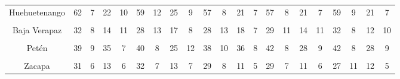 \begin{tabular}[t]{ccccccccccccccccccccc}
Huehuetenango & 62 & 7 & 22 & 10 & 59 & 12 & 25 & 9 & 57 & 8 & 21 & 7 & 57 & 8 & 21 & 7 & 59 & 9 & 21 & 7\\
\cellcolor[HTML]{B6B3FF}{Quiché} & \cellcolor[HTML]{B6B3FF}{44} & \cellcolor[HTML]{B6B3FF}{10} & \cellcolor[HTML]{B6B3FF}{19} & \cellcolor[HTML]{B6B3FF}{10} & \cellcolor[HTML]{B6B3FF}{43} & \cellcolor[HTML]{B6B3FF}{6} & \cellcolor[HTML]{B6B3FF}{18} & \cellcolor[HTML]{B6B3FF}{11} & \cellcolor[HTML]{B6B3FF}{44} & \cellcolor[HTML]{B6B3FF}{7} & \cellcolor[HTML]{B6B3FF}{19} & \cellcolor[HTML]{B6B3FF}{8} & \cellcolor[HTML]{B6B3FF}{47} & \cellcolor[HTML]{B6B3FF}{6} & \cellcolor[HTML]{B6B3FF}{21} & \cellcolor[HTML]{B6B3FF}{5} & \cellcolor[HTML]{B6B3FF}{42} & \cellcolor[HTML]{B6B3FF}{7} & \cellcolor[HTML]{B6B3FF}{19} & \cellcolor[HTML]{B6B3FF}{6}\\
Baja Verapaz & 32 & 8 & 14 & 11 & 28 & 13 & 17 & 8 & 28 & 13 & 18 & 7 & 29 & 11 & 14 & 11 & 32 & 8 & 12 & 10\\
\cellcolor[HTML]{B6B3FF}{Alta Verapaz} & \cellcolor[HTML]{B6B3FF}{39} & \cellcolor[HTML]{B6B3FF}{10} & \cellcolor[HTML]{B6B3FF}{16} & \cellcolor[HTML]{B6B3FF}{9} & \cellcolor[HTML]{B6B3FF}{41} & \cellcolor[HTML]{B6B3FF}{7} & \cellcolor[HTML]{B6B3FF}{16} & \cellcolor[HTML]{B6B3FF}{8} & \cellcolor[HTML]{B6B3FF}{39} & \cellcolor[HTML]{B6B3FF}{8} & \cellcolor[HTML]{B6B3FF}{18} & \cellcolor[HTML]{B6B3FF}{6} & \cellcolor[HTML]{B6B3FF}{39} & \cellcolor[HTML]{B6B3FF}{8} & \cellcolor[HTML]{B6B3FF}{18} & \cellcolor[HTML]{B6B3FF}{6} & \cellcolor[HTML]{B6B3FF}{36} & \cellcolor[HTML]{B6B3FF}{7} & \cellcolor[HTML]{B6B3FF}{17} & \cellcolor[HTML]{B6B3FF}{4}\\
Petén & 39 & 9 & 35 & 7 & 40 & 8 & 25 & 12 & 38 & 10 & 36 & 8 & 42 & 8 & 28 & 9 & 42 & 8 & 28 & 9\\
\cellcolor[HTML]{B6B3FF}{Izabal} & \cellcolor[HTML]{B6B3FF}{23} & \cellcolor[HTML]{B6B3FF}{10} & \cellcolor[HTML]{B6B3FF}{13} & \cellcolor[HTML]{B6B3FF}{8} & \cellcolor[HTML]{B6B3FF}{24} & \cellcolor[HTML]{B6B3FF}{10} & \cellcolor[HTML]{B6B3FF}{15} & \cellcolor[HTML]{B6B3FF}{9} & \cellcolor[HTML]{B6B3FF}{24} & \cellcolor[HTML]{B6B3FF}{9} & \cellcolor[HTML]{B6B3FF}{15} & \cellcolor[HTML]{B6B3FF}{7} & \cellcolor[HTML]{B6B3FF}{20} & \cellcolor[HTML]{B6B3FF}{11} & \cellcolor[HTML]{B6B3FF}{13} & \cellcolor[HTML]{B6B3FF}{9} & \cellcolor[HTML]{B6B3FF}{24} & \cellcolor[HTML]{B6B3FF}{8} & \cellcolor[HTML]{B6B3FF}{14} & \cellcolor[HTML]{B6B3FF}{7}\\
Zacapa & 31 & 6 & 13 & 6 & 32 & 7 & 13 & 7 & 29 & 8 & 11 & 5 & 29 & 7 & 11 & 6 & 27 & 11 & 12 & 5\\

\end{tabular}
